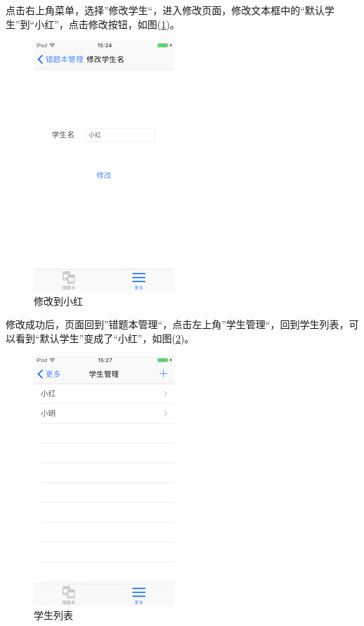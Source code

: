 点击右上角菜单，选择”修改学生“，进入修改页面，修改文本框中的“默认学生”到“小红”，点击修改按钮，如图(\ref{img12})。
\begin{figure}[H]
	\centering
	\includegraphics{img/12.png}
	\caption{修改到小红}
	\label{img12}
\end{figure}

修改成功后，页面回到”错题本管理“，点击左上角”学生管理“，回到学生列表，可以看到“默认学生”变成了“小红”，如图(\ref{img13})。
\begin{figure}[H]
	\centering
	\includegraphics{img/13.png}
	\caption{学生列表}
	\label{img13}
\end{figure}


